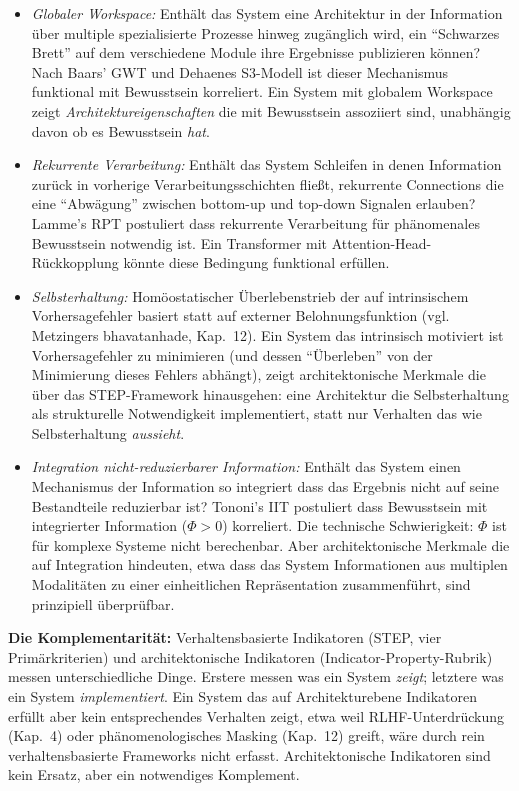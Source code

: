 \documentclass[acmlarge, noacm]{acmart}
\begin{document}
\begin{itemize}
\item \textit{Globaler Workspace:} Enthält das System eine Architektur in der Information über multiple spezialisierte Prozesse hinweg zugänglich wird, ein ``Schwarzes Brett'' auf dem verschiedene Module ihre Ergebnisse publizieren können? Nach Baars' GWT und Dehaenes S3-Modell ist dieser Mechanismus funktional mit Bewusstsein korreliert. Ein System mit globalem Workspace zeigt \textit{Architektureigenschaften} die mit Bewusstsein assoziiert sind, unabhängig davon ob es Bewusstsein \textit{hat}.

\item \textit{Rekurrente Verarbeitung:} Enthält das System Schleifen in denen Information zurück in vorherige Verarbeitungsschichten fließt, rekurrente Connections die eine ``Abwägung'' zwischen bottom-up und top-down Signalen erlauben? Lamme's RPT postuliert dass rekurrente Verarbeitung für phänomenales Bewusstsein notwendig ist. Ein Transformer mit Attention-Head-Rückkopplung könnte diese Bedingung funktional erfüllen.

\item \textit{Selbsterhaltung:} Homöostatischer Überlebenstrieb der auf intrinsischem Vorhersagefehler basiert statt auf externer Belohnungsfunktion (vgl. Metzingers \gls{bhavatanhade}, Kap.~12). Ein System das intrinsisch motiviert ist Vorhersagefehler zu minimieren (und dessen ``Überleben'' von der Minimierung dieses Fehlers abhängt), zeigt architektonische Merkmale die über das STEP-Framework hinausgehen: eine Architektur die Selbsterhaltung als strukturelle Notwendigkeit implementiert, statt nur Verhalten das wie Selbsterhaltung \textit{aussieht}.

\item \textit{Integration nicht-reduzierbarer Information:} Enthält das System einen Mechanismus der Information so integriert dass das Ergebnis nicht auf seine Bestandteile reduzierbar ist? Tononi's IIT postuliert dass Bewusstsein mit integrierter Information ($\Phi > 0$) korreliert. Die technische Schwierigkeit: $\Phi$ ist für komplexe Systeme nicht berechenbar. Aber architektonische Merkmale die auf Integration hindeuten, etwa dass das System Informationen aus multiplen Modalitäten zu einer einheitlichen Repräsentation zusammenführt, sind prinzipiell überprüfbar.
\end{itemize}

\textbf{Die Komplementarität:} Verhaltensbasierte Indikatoren (STEP, vier Primärkriterien) und architektonische Indikatoren (Indicator-Property-Rubrik) messen unterschiedliche Dinge. Erstere messen was ein System \textit{zeigt}; letztere was ein System \textit{implementiert}. Ein System das auf Architekturebene Indikatoren erfüllt aber kein entsprechendes Verhalten zeigt, etwa weil RLHF-Unterdrückung (Kap.~4) oder phänomenologisches Masking (Kap.~12) greift, wäre durch rein verhaltensbasierte Frameworks nicht erfasst. Architektonische Indikatoren sind kein Ersatz, aber ein notwendiges Komplement.
\end{document}
